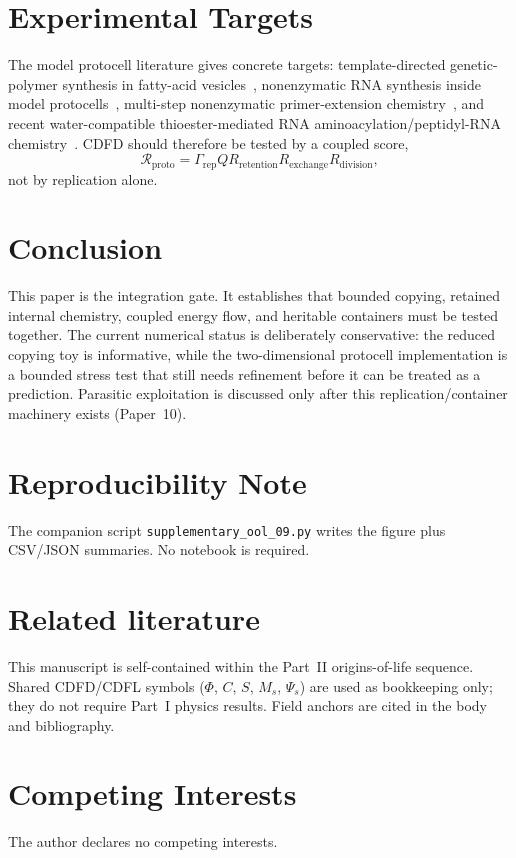 \documentclass[11pt,a4paper]{article}
\begin{document}
\section{Experimental Targets}
The model protocell literature gives concrete targets: template-directed genetic-polymer synthesis in fatty-acid vesicles~\cite{Mansy2008}, nonenzymatic RNA synthesis inside model protocells~\cite{Adamala2013}, multi-step nonenzymatic primer-extension chemistry~\cite{Walton2018}, and recent water-compatible thioester-mediated RNA aminoacylation/peptidyl-RNA chemistry~\cite{Singh2025}. CDFD should therefore be tested by a coupled score,
\begin{equation}
\mathcal{R}_{\mathrm{proto}}
=
\Gamma_{\mathrm{rep}}Q
R_{\mathrm{retention}}
R_{\mathrm{exchange}}
R_{\mathrm{division}},
\end{equation}
not by replication alone.

\section{Conclusion}
This paper is the integration gate. It establishes that bounded copying, retained
internal chemistry, coupled energy flow, and heritable containers must be tested
together. The current numerical status is deliberately conservative: the
reduced copying toy is informative, while the two-dimensional protocell
implementation is a bounded stress test that still needs refinement before it
can be treated as a prediction. Parasitic exploitation is discussed only
after this replication/container machinery exists (Paper~10).

\section{Reproducibility Note}
The companion script \texttt{supplementary\_ool\_09.py} writes the figure
 plus CSV/JSON
summaries. No notebook is required.

\section*{Related literature}
This manuscript is self-contained within the Part~II origins-of-life sequence. Shared CDFD/CDFL symbols ($\Phi$, $C$, $S$, $M_s$, $\Psi_s$) are used as bookkeeping only; they do not require Part~I physics results. Field anchors are cited in the body and bibliography.

\section*{Competing Interests}
The author declares no competing interests.
\end{document}
